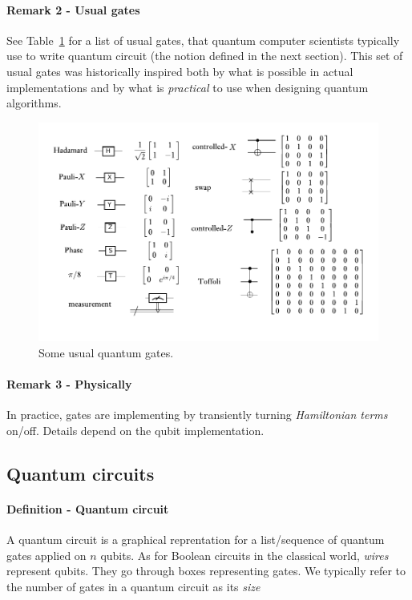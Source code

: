 \documentclass{article}
\begin{document}
\paragraph{Remark 2 - Usual gates} See Table~\ref{usual} for 
a list of usual gates, that quantum computer scientists
typically use to write quantum circuit (the notion defined
in the next section). This set of usual gates
was historically inspired both by what is possible in actual
implementations and by what is \emph{practical} to use
when designing quantum algorithms.

\begin{center}
    \begin{figure}
    \includegraphics[width=\textwidth]{quantum_gates.pdf}
    \caption{Some usual quantum gates.} 
        \label{usual}
    \end{figure}
\end{center}

\paragraph{Remark 3 - Physically} In practice, gates
are implementing by transiently turning 
\emph{Hamiltonian terms} on/off. Details
depend on the qubit implementation.

\subsection{Quantum circuits}

\paragraph{Definition - Quantum circuit} A quantum
circuit is a graphical reprentation for a list/sequence
of quantum gates applied on $n$ qubits. As for
Boolean circuits in the classical world,
\emph{wires} represent qubits. They go through
boxes representing gates.
We typically refer to the number of gates in a quantum circuit as its \emph{size}
\end{document}
